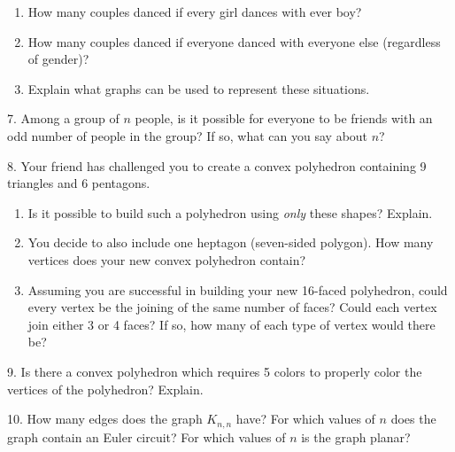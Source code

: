 \documentclass[10pt,]{book}
\theoremstyle{plain}
\theoremstyle{definition}
\theoremstyle{definition}
\theoremstyle{definition}
\numberwithin{equation}{chapter}
\begin{document}
\begin{exerciselist}
\begin{enumerate}[label=(\alph*)]
\item\hypertarget{li-1247}{}
                How many couples danced if every girl dances with ever boy?
\item\hypertarget{li-1248}{}
                How many couples danced if everyone danced with everyone else (regardless of gender)?
\item\hypertarget{li-1249}{}
                Explain what graphs can be used to represent these situations.
\end{enumerate}
\par\smallskip
\item[7.]\hypertarget{exercise-300}{}
            Among a group of \(n\) people, is it possible for everyone to be friends with an odd number of people in the group? If so, what can you say about \(n\)?
\par\smallskip
\item[8.]\hypertarget{exercise-301}{}
            Your friend has challenged you to create a convex polyhedron containing 9 triangles and 6 pentagons.
\leavevmode%
\begin{enumerate}[label=(\alph*)]
\item\hypertarget{li-1253}{}
                Is it possible to build such a polyhedron using \emph{only} these shapes? Explain.
\item\hypertarget{li-1254}{}
                You decide to also include one heptagon (seven-sided polygon). How many vertices does your new convex polyhedron contain?
\item\hypertarget{li-1255}{}
                Assuming you are successful in building your new 16-faced polyhedron, could every vertex be the joining of the same number of faces? Could each vertex join either 3 or 4 faces? If so, how many of each type of vertex would there be?
\end{enumerate}
\par\smallskip
\item[9.]\hypertarget{exercise-302}{}
            Is there a convex polyhedron which requires 5 colors to properly color the vertices of the polyhedron? Explain.
\par\smallskip
\item[10.]\hypertarget{exercise-303}{}
            How many edges does the graph \(K_{n,n}\) have? For which values of \(n\) does the graph contain an Euler circuit? For which values of \(n\) is the graph planar?

\end{exerciselist}
\end{document}
